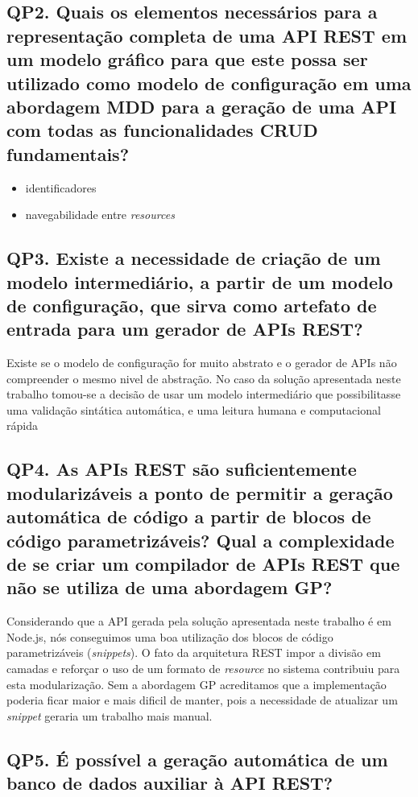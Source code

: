 \subsection{QP2. Quais os elementos necessários para a representação completa de uma API REST em um modelo gráfico para que este possa ser utilizado como modelo de configuração em uma abordagem MDD para a geração de uma API com todas as funcionalidades CRUD fundamentais?}

\begin{itemize}
	\item identificadores
	\item navegabilidade entre \textit{resources}
\end{itemize}

\subsection{QP3. Existe a necessidade de criação de um modelo intermediário, a partir de um modelo de configuração, que sirva como artefato de entrada para um gerador de APIs REST?}

Existe se o modelo de configuração for muito abstrato e o gerador de APIs não compreender o mesmo nivel de abstração. No caso da solução apresentada neste trabalho tomou-se a decisão de usar um modelo intermediário que possibilitasse uma validação sintática automática, e uma leitura humana e computacional rápida

\subsection{QP4. As APIs REST são suficientemente modularizáveis a ponto de permitir a geração automática de código a partir de blocos de código parametrizáveis? Qual a complexidade de se criar um compilador de APIs REST que não se utiliza de uma abordagem GP?}

Considerando que a API gerada pela solução apresentada neste trabalho é em Node.js, nós conseguimos uma boa utilização dos blocos de código parametrizáveis (\textit{snippets}). O fato da arquitetura REST impor a divisão em camadas e reforçar o uso de um formato de \textit{resource} no sistema contribuiu para esta modularização. Sem a abordagem GP acreditamos que a implementação poderia ficar maior e mais dificil de manter, pois a necessidade de atualizar um \textit{snippet} geraria um trabalho mais manual.

\subsection{QP5. É possível a geração automática de um banco de dados auxiliar à API REST?}

